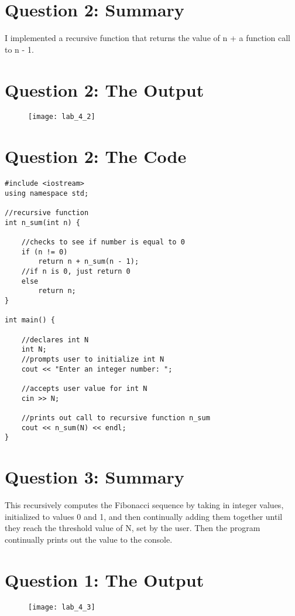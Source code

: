 \documentclass[11pt]{article}
\begin{document}
\section*{Question 2: Summary}
I implemented a recursive function that returns the value of n + a function call to n - 1. 

\section*{Question 2: The Output}
\begin{figure}[H]
    \centering
    \texttt{[image: lab\_4\_2]}
\end{figure}


\section*{Question 2: The Code}
\begin{lstlisting}
#include <iostream>
using namespace std;

//recursive function
int n_sum(int n) {

    //checks to see if number is equal to 0
    if (n != 0)
        return n + n_sum(n - 1);
    //if n is 0, just return 0
    else
        return n;
}

int main() {

    //declares int N
    int N;
    //prompts user to initialize int N
    cout << "Enter an integer number: ";

    //accepts user value for int N
    cin >> N;

    //prints out call to recursive function n_sum
    cout << n_sum(N) << endl;
}
\end{lstlisting}

\section*{Question 3: Summary}
This recursively computes the Fibonacci sequence by taking in integer values, initialized to values 0 and 1, and then continually adding them together until they reach the threshold value of N, set by the user. Then the program continually prints out the value to the console.

\section*{Question 1: The Output}
\begin{figure}[H]
    \centering
    \texttt{[image: lab\_4\_3]}
\end{figure}
\end{document}
